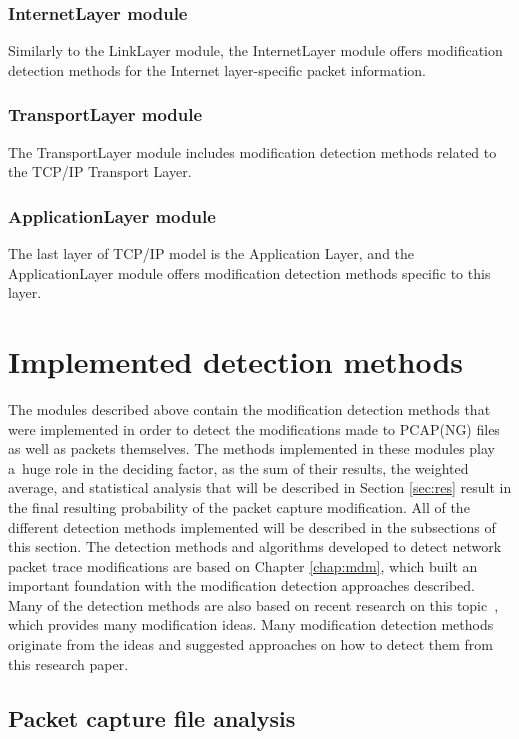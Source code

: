 \documentclass[
  printed,     %
  color,       %
  oneside,     %
  nosansbold,  %
  nocolorbold, %
  nolof,         %
  nolot,         %
]{fithesis4}
\begin{document}
\subsubsection{InternetLayer module}

Similarly to the LinkLayer module, the InternetLayer module offers modification detection methods for the Internet layer-specific packet information.

\subsubsection{TransportLayer module}

The TransportLayer module includes modification detection methods related to the TCP/IP Transport Layer.

\subsubsection{ApplicationLayer module}

The last layer of TCP/IP model is the Application Layer, and the ApplicationLayer module offers modification detection methods specific to this layer.


\section{Implemented detection methods}

The modules described above contain the modification detection methods that were implemented in order to detect the modifications made to PCAP(NG) files as well as packets themselves. The methods implemented in these modules play a~huge role in the deciding factor, as the sum of their results, the weighted average, and statistical analysis that will be described in Section \ref{sec:res} result in the final resulting probability of the packet capture modification. All of the different detection methods implemented will be described in the subsections of this section. The detection methods and algorithms developed to detect network packet trace modifications are based on Chapter \ref{chap:mdm}, which built an important foundation with the modification detection approaches described. Many of the detection methods are also based on recent research on this topic~\cite{Howcanne5:online}, which provides many modification ideas. Many modification detection methods originate from the ideas and suggested approaches on how to detect them from this research paper.

\subsection{Packet capture file analysis}
\end{document}
